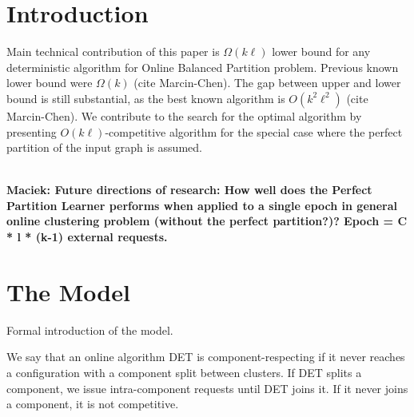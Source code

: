 \documentclass[conference]{IEEEtran}
\newcommand\maciek[1]{\color{brown}\textbf{\\ Maciek: #1}\color{black}}
\begin{document}
\section{Introduction}

Main technical contribution of this paper is $\Omega(k\ell)$ lower bound for any deterministic algorithm for Online Balanced Partition problem.
Previous known lower bound were $\Omega(k)$ (cite Marcin-Chen).
The gap between upper and lower bound is still substantial, as the best known algorithm is $O(k^2\ell^2)$ (cite Marcin-Chen).
We contribute to the search for the optimal algorithm by presenting $O(k\ell)$-competitive algorithm for the special case where the perfect partition of the input graph is assumed.

\maciek{Future directions of research: How well does the Perfect Partition Learner performs when applied to a single epoch in general online clustering problem (without the perfect partition?)? Epoch = C * l * (k-1) external requests.}

\section{The Model}

Formal introduction of the model.

 We say that an online algorithm DET is component-respecting if it never reaches a configuration with a component split between clusters.
 If DET splits a component, we issue intra-component requests until DET joins it.
 If it never joins a component, it is not competitive.
 




\appendix


	
\end{document}

